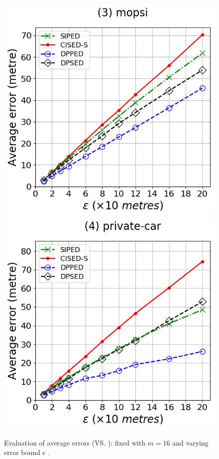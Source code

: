 {\begin{figure}[tb]
	\includegraphics[scale = 0.2900]{Figures/Exp-error-epsilon-ped-mopsi.png}\hspace{1ex}
	\includegraphics[scale = 0.2900]{Figures/Exp-error-epsilon-ped-private.png}
	\caption{\small Evaluation of average errors (\ped VS. \sed): fixed with $m=16$ and varying
    error bound $\epsilon$ .}
	\label{fig:ae-ped}
\end{figure}


}
